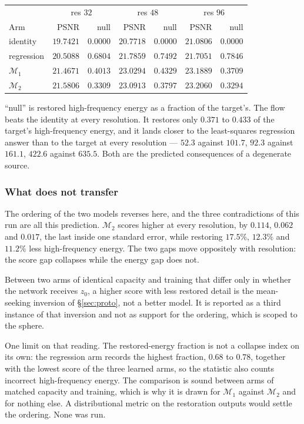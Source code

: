 \documentclass[11pt]{article}
\begin{document}
\begin{center}
\begin{tabular}{@{}lrrrrrr@{}}
\toprule
& \multicolumn{2}{c}{res $32$} & \multicolumn{2}{c}{res $48$} & \multicolumn{2}{c}{res $96$}\\
Arm & PSNR & null & PSNR & null & PSNR & null\\
\midrule
identity & $19.7421$ & $0.0000$ & $20.7718$ & $0.0000$ & $21.0806$ & $0.0000$\\
regression & $20.5088$ & $0.6804$ & $21.7859$ & $0.7492$ & $21.7051$ & $0.7846$\\
$\mathcal M_1$ & $21.4671$ & $0.4013$ & $23.0294$ & $0.4329$ & $23.1889$ & $0.3709$\\
$\mathcal M_2$ & $21.5806$ & $0.3309$ & $23.0913$ & $0.3797$ & $23.2060$ & $0.3294$\\
\bottomrule
\end{tabular}
\end{center}

``null'' is restored high-frequency energy as a fraction of the target's. The flow beats the
identity at every resolution. It restores only $0.371$ to $0.433$ of the target's high-frequency
energy, and it lands closer to the least-squares regression answer than to the target at every
resolution --- $52.3$ against $101.7$, $92.3$ against $161.1$, $422.6$ against $635.5$. Both are
the predicted consequences of a degenerate source.

\subsubsection*{What does not transfer}

The ordering of the two models reverses here, and the three contradictions of this run are all
this prediction. $\mathcal M_2$ scores higher at every resolution, by $0.114$, $0.062$ and
$0.017$, the last inside one standard error, while restoring $17.5\%$, $12.3\%$ and $11.2\%$ less
high-frequency energy. The two gaps move oppositely with resolution: the score gap collapses
while the energy gap does not.

Between two arms of identical capacity and training that differ only in whether the network
receives $z_0$, a higher score with less restored detail is the mean-seeking inversion of
\S\ref{sec:proto}, not a better model. It is reported as a third instance of that inversion and
not as support for the ordering, which is scoped to the sphere.

One limit on that reading. The restored-energy fraction is not a collapse index on its own: the
regression arm records the highest fraction, $0.68$ to $0.78$, together with the lowest score of
the three learned arms, so the statistic also counts incorrect high-frequency energy. The
comparison is sound between arms of matched capacity and training, which is why it is drawn for
$\mathcal M_1$ against $\mathcal M_2$ and for nothing else. A distributional metric on the
restoration outputs would settle the ordering. None was run.
\end{document}
